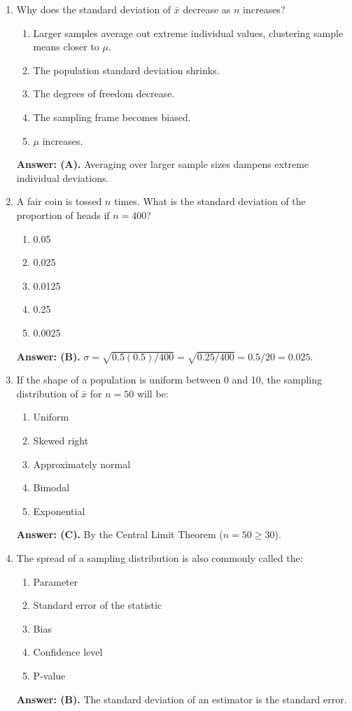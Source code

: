 \begin{enumerate}[resume, leftmargin=1.5em]
  \item Why does the standard deviation of $\bar{x}$ decrease as $n$ increases?
  \begin{enumerate}[label=(\Alph*)]
    \item Larger samples average out extreme individual values, clustering sample means closer to $\mu$.
    \item The population standard deviation shrinks.
    \item The degrees of freedom decrease.
    \item The sampling frame becomes biased.
    \item $\mu$ increases.
  \end{enumerate}
  \textbf{Answer: (A).} Averaging over larger sample sizes dampens extreme individual deviations.

  \item A fair coin is tossed $n$ times. What is the standard deviation of the proportion of heads if $n = 400$?
  \begin{enumerate}[label=(\Alph*)]
    \item 0.05 \item 0.025 \item 0.0125 \item 0.25 \item 0.0025
  \end{enumerate}
  \textbf{Answer: (B).} $\sigma = \sqrt{0.5(0.5)/400} = \sqrt{0.25/400} = 0.5/20 = 0.025$.

  \item If the shape of a population is uniform between 0 and 10, the sampling distribution of $\bar{x}$ for $n = 50$ will be:
  \begin{enumerate}[label=(\Alph*)]
    \item Uniform \item Skewed right \item Approximately normal \item Bimodal \item Exponential
  \end{enumerate}
  \textbf{Answer: (C).} By the Central Limit Theorem ($n = 50 \ge 30$).

  \item The spread of a sampling distribution is also commonly called the:
  \begin{enumerate}[label=(\Alph*)]
    \item Parameter \item Standard error of the statistic \item Bias \item Confidence level \item P-value
  \end{enumerate}
  \textbf{Answer: (B).} The standard deviation of an estimator is the standard error.


\end{enumerate}
